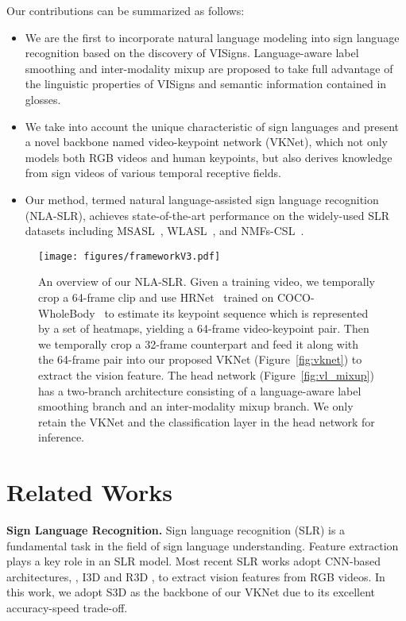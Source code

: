 \documentclass[10pt,twocolumn,letterpaper]{article}
\begin{document}
Our contributions can be summarized as follows:
\vspace{-2mm}
\begin{itemize}
\setlength{\itemsep}{0pt}
\setlength{\parsep}{0pt}
\setlength{\parskip}{3pt}
    \item We are the first to incorporate natural language modeling into sign language recognition based on the discovery of VISigns. Language-aware label smoothing and inter-modality mixup are proposed to take full advantage of the linguistic properties of VISigns and semantic information contained in glosses.
    \item We take into account the unique characteristic of sign languages and present a novel backbone named video-keypoint network (VKNet), which not only models both RGB videos and human keypoints, but also derives knowledge from sign videos of various temporal receptive fields.
    \item Our method, termed natural language-assisted sign language recognition (NLA-SLR), achieves state-of-the-art performance on the widely-used SLR datasets including MSASL~\cite{joze2019ms}, WLASL~\cite{li2020word}, and NMFs-CSL~\cite{hu2021global}.
\end{itemize}


\begin{figure*}[t]
\centering
\texttt{[image: figures/frameworkV3.pdf]}
\vspace{-3mm}
\caption{An overview of our NLA-SLR. Given a training video, we temporally crop a 64-frame clip \cite{li2020transferring} and use HRNet~\cite{sun2019deep} trained on COCO-WholeBody~\cite{jin2020whole} to estimate its keypoint sequence which is represented by a set of heatmaps, yielding a 64-frame video-keypoint pair. Then we temporally crop a 32-frame counterpart and feed it along with the 64-frame pair into our proposed VKNet (Figure~\ref{fig:vknet}) to extract the vision feature. The head network (Figure~\ref{fig:vl_mixup}) has a two-branch architecture consisting of a language-aware label smoothing branch and an inter-modality mixup branch. We only retain the VKNet and the classification layer in the head network for inference.}
\vspace{-5mm}
\label{fig:framework}
\end{figure*}

 \vspace{-4mm}
\section{Related Works}
\noindent\textbf{Sign Language Recognition.} Sign language recognition (SLR) is a fundamental task in the field of sign language understanding.
Feature extraction plays a key role in an SLR model.
Most recent SLR works \cite{jiang2021sign, jiang2021skeleton, hu2021signbert, hu2021hand, li2020transferring, li2020word, joze2019ms, hu2021global, stmc, zuo22_interspeech, vac} adopt CNN-based architectures, \eg, I3D \cite{I3D} and R3D \cite{qiu2017learning}, to extract vision features from RGB videos.
In this work, we adopt S3D \cite{xie2018rethinking} as the backbone of our VKNet due to its excellent accuracy-speed trade-off.
\end{document}

